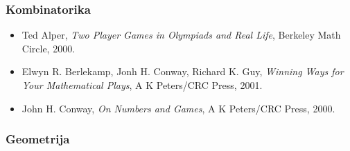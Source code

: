 \subsubsection{Kombinatorika}
\begin{itemize}
  \item Ted Alper, \emph{Two Player Games in Olympiads and Real Life},
    Berkeley Math Circle, 2000.
  \item Elwyn R. Berlekamp, Jonh H. Conway, Richard K. Guy, \emph{Winning
    Ways for Your Mathematical Plays}, A K Peters/CRC
    Press, 2001.
  \item John H. Conway, \emph{On Numbers and Games}, A K Peters/CRC Press,
    2000.
\end{itemize}
\subsubsection{Geometrija}
\begin{itemize}
\end{itemize}

